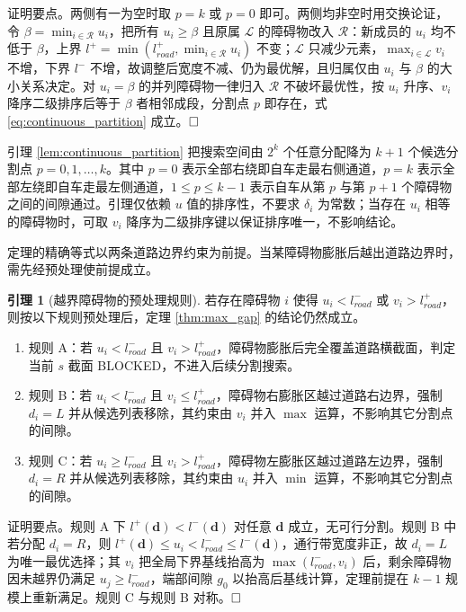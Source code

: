 \documentclass[a4paper,zihao=5]{ctexart}
\theoremstyle{definition}
\newtheorem{lemma}{引理}[section]
\begin{document}
证明要点。两侧有一为空时取 $p=k$ 或 $p=0$ 即可。两侧均非空时用交换论证，令 $\beta = \min_{i \in \mathcal{R}} u_i$，把所有 $u_i \geq \beta$ 且原属 $\mathcal{L}$ 的障碍物改入 $\mathcal{R}$：新成员的 $u_i$ 均不低于 $\beta$，上界 $l^{+} = \min(l_{road}^{+}, \min_{i\in\mathcal{R}} u_i)$ 不变；$\mathcal{L}$ 只减少元素，$\max_{i \in \mathcal{L}} v_i$ 不增，下界 $l^{-}$ 不增，故调整后宽度不减、仍为最优解，且归属仅由 $u_i$ 与 $\beta$ 的大小关系决定。对 $u_i = \beta$ 的并列障碍物一律归入 $\mathcal{R}$ 不破坏最优性，按 $u_i$ 升序、$v_i$ 降序二级排序后等于 $\beta$ 者相邻成段，分割点 $p$ 即存在，式 \eqref{eq:continuous_partition} 成立。$\hfill\Box$

引理 \ref{lem:continuous_partition} 把搜索空间由 $2^k$ 个任意分配降为 $k+1$ 个候选分割点 $p = 0, 1, \ldots, k$。其中 $p=0$ 表示全部右绕即自车走最右侧通道，$p=k$ 表示全部左绕即自车走最左侧通道，$1 \leq p \leq k-1$ 表示自车从第 $p$ 与第 $p+1$ 个障碍物之间的间隙通过。引理仅依赖 $u$ 值的排序性，不要求 $\delta_i$ 为常数；当存在 $u_i$ 相等的障碍物时，可取 $v_i$ 降序为二级排序键以保证排序唯一，不影响结论。

定理的精确等式以两条道路边界约束为前提。当某障碍物膨胀后越出道路边界时，需先经预处理使前提成立。

\begin{lemma}[越界障碍物的预处理规则]
\label{lem:boundary_trim}
若存在障碍物 $i$ 使得 $u_i < l_{road}^{-}$ 或 $v_i > l_{road}^{+}$，则按以下规则预处理后，定理 \ref{thm:max_gap} 的结论仍然成立。
\begin{enumerate}
    \item 规则 A：若 $u_i < l_{road}^{-}$ 且 $v_i > l_{road}^{+}$，障碍物膨胀后完全覆盖道路横截面，判定当前 $s$ 截面 BLOCKED，不进入后续分割搜索。
    \item 规则 B：若 $u_i < l_{road}^{-}$ 且 $v_i \leq l_{road}^{+}$，障碍物右膨胀区越过道路右边界，强制 $d_i = L$ 并从候选列表移除，其约束由 $v_i$ 并入 $\max$ 运算，不影响其它分割点的间隙。
    \item 规则 C：若 $u_i \geq l_{road}^{-}$ 且 $v_i > l_{road}^{+}$，障碍物左膨胀区越过道路左边界，强制 $d_i = R$ 并从候选列表移除，其约束由 $u_i$ 并入 $\min$ 运算，不影响其它分割点的间隙。
\end{enumerate}
\end{lemma}

证明要点。规则 A 下 $l^{+}(\mathbf{d}) < l^{-}(\mathbf{d})$ 对任意 $\mathbf{d}$ 成立，无可行分割。规则 B 中若分配 $d_i = R$，则 $l^{+}(\mathbf{d}) \leq u_i < l_{road}^{-} \leq l^{-}(\mathbf{d})$，通行带宽度非正，故 $d_i = L$ 为唯一最优选择；其 $v_i$ 把全局下界基线抬高为 $\max(l_{road}^{-},v_i)$ 后，剩余障碍物因未越界仍满足 $u_j\geq l_{road}^{-}$，端部间隙 $g_0$ 以抬高后基线计算，定理前提在 $k-1$ 规模上重新满足。规则 C 与规则 B 对称。$\hfill\Box$
\end{document}
